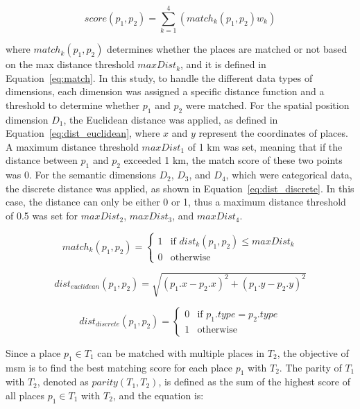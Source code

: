\documentclass{article}
\theoremstyle{definition}
\theoremstyle{remark}
\begin{document}
\begin{equation} \label{eq:match_score}
    score(p_{1},p_{2}) = \sum_{k=1}^{4}(match_{k}(p_{1},p_{2})w_{k})
\end{equation}

where $match_{k}(p_{1},p_{2})$ determines whether the places are matched or not based on the max distance threshold $maxDist_{k}$, and it is defined in Equation~\ref{eq:match}. In this study, to handle the different data types of dimensions, each dimension was assigned a specific distance function and a threshold to determine whether $p_{1}$ and $p_{2}$ were matched. For the spatial position dimension $D_{1}$, the Euclidean distance was applied, as defined in Equation~\ref{eq:dist_euclidean}, where $x$ and $y$ represent the coordinates of places. A maximum distance threshold $maxDist_{1}$ of 1 km was set, meaning that if the distance between $p_{1}$ and $p_{2}$ exceeded 1 km, the match score of these two points was 0. For the semantic dimensions $D_{2}$, $D_{3}$, and $D_{4}$, which were categorical data, the discrete distance was applied, as shown in Equation~\ref{eq:dist_discrete}. In this case, the distance can only be either 0 or 1, thus a maximum distance threshold of 0.5 was set for $maxDist_{2}$, $maxDist_{3}$, and $maxDist_{4}$.

\begin{equation} \label{eq:match}
    match_{k}(p_{1},p_{2}) = \begin{cases}
    1 & \text{if } dist_{k}(p_{1},p_{2}) \leq maxDist_{k}  \\
    0 & \text{otherwise}
    \end{cases}
\end{equation}

\begin{equation} \label{eq:dist_euclidean}
    dist_{euclidean}(p_{1},p_{2}) = \sqrt{(p_{1}.x-p_{2}.x)^2+(p_{1}.y-p_{2}.y)^2}
\end{equation}

\begin{equation} \label{eq:dist_discrete}
    dist_{discrete}(p_{1},p_{2}) = \begin{cases}
    0 & \text{if } p_{1}.type = p_{2}.type  \\
    1 & \text{otherwise}
    \end{cases}
\end{equation}

Since a place $p_{1} \in T_{1}$ can be matched with multiple places in $T_{2}$, the objective of \acrshort{msm} is to find the best matching score for each place $p_{1}$ with $T_{2}$. The parity of $T_{1}$ with $T_{2}$, denoted as $parity(T_{1},T_{2})$, is defined as the sum of the highest score of all places $p_{1} \in T_{1}$ with $T_{2}$, and the equation is:
\end{document}
